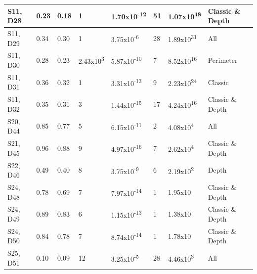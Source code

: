 \begin{table}[h]
\begin{tabular}{  l  p{1cm}  p{1cm} p{1.5cm} p{1.5cm} p{1.5cm} p{1.5cm} p{1.5cm}}
S11, D28
& 0.23
& 0.18
& 1
& 1.70x10\textsuperscript{-12}
& 51
& 1.07x10\textsuperscript{48}
&  Classic \& Depth \\\hline
S11, D29
& 0.34
& 0.30
& 1
& 3.75x10\textsuperscript{-6}
&28
& 1.89x10\textsuperscript{31}
&  All \\\hline
S11, D30
& 0.28
& 0.23
& 2.43x10\textsuperscript{3}
& 5.87x10\textsuperscript{-10}
& 7
& 8.52x10\textsuperscript{16}
&  Perimeter \\\hline
S11, D31 
& 0.36
& 0.32
& 1
& 3.31x10\textsuperscript{-13}
& 9
& 2.23x10\textsuperscript{24}
& Classic \\\hline
S11, D32
& 0.35
& 0.31
& 3
& 1.44x10\textsuperscript{-15}
& 17
& 4.24x10\textsuperscript{16}
&  Classic \& Depth \\\hline
S20, D44
& 0.85
& 0.77
& 5
& 6.15x10\textsuperscript{-11}
& 2
& 4.08x10\textsuperscript{4}
&  All \\\hline
S21, D45
& 0.96
& 0.88
& 9
& 4.97x10\textsuperscript{-16}
& 7
& 2.62x10\textsuperscript{4}
& Classic \& Depth \\\hline
S22, D46
& 0.49
& 0.40
& 8
& 3.75x10\textsuperscript{-9}
& 6
& 2.19x10\textsuperscript{2}
& Depth \\\hline
S24, D48
& 0.78
& 0.69
& 7
& 7.97x10\textsuperscript{-14}
& 1
& 1.95x10
& Classic \& Depth \\\hline
S24, D49
& 0.89
& 0.83
& 6
& 1.15x10\textsuperscript{-13}
& 1
& 1.38x10
&  Classic \& Depth\\\hline
S24, D50
& 0.84
& 0.78
& 7
& 8.74x10\textsuperscript{-14}
& 1
& 1.78x10
& Classic \& Depth\\\hline
S25, D51
& 0.10
& 0.09
& 12
& 3.25x10\textsuperscript{-5}
& 28
& 4.46x10\textsuperscript{3}
& All \\
        \bottomrule
    \end{tabular}
\end{table}


